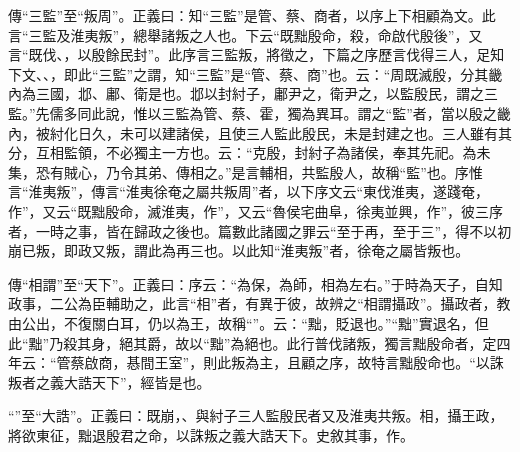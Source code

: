{\noindent\zhuan{}\fzbyks 傳“三監”至“叛周”。正義曰：知“三監”是管、蔡、商者，以序上下相顧為文。此言“三監及淮夷叛”，總舉諸叛之人也。下云“既黜殷命，殺，命啟代殷後”，又言“既伐、，以殷餘民封”。此序言三監叛，將徵之，下篇之序歷言伐得三人，足知下文、、，即此“三監”之謂，知“三監”是“管、蔡、商”也。云：“周既滅殷，分其畿內為三國，邶、鄘、衛是也。邶以封紂子，鄘尹之，衛尹之，以監殷民，謂之三監。”先儒多同此說，惟以三監為管、蔡、霍，獨為異耳。謂之“監”者，當以殷之畿內，被紂化日久，未可以建諸侯，且使三人監此殷民，未是封建之也。三人雖有其分，互相監領，不必獨主一方也。云：“克殷，封紂子為諸侯，奉其先祀。為未集，恐有賊心，乃令其弟、傳相之。”是言輔相，共監殷人，故稱“監”也。序惟言“淮夷叛”，傳言“淮夷徐奄之屬共叛周”者，以下序文云“東伐淮夷，遂踐奄，作”，又云“既黜殷命，滅淮夷，作”，又云“魯侯宅曲阜，徐夷並興，作”，彼三序者，一時之事，皆在歸政之後也。篇數此諸國之罪云“至于再，至于三”，得不以初崩已叛，即政又叛，謂此為再三也。以此知“淮夷叛”者，徐奄之屬皆叛也。 \par}

{\noindent\zhuan{}\fzbyks 傳“相謂”至“天下”。正義曰：序云：“為保，為師，相為左右。”于時為天子，自知政事，二公為臣輔助之，此言“相”者，有異于彼，故辨之“相謂攝政”。攝政者，教由公出，不復關白耳，仍以為王，故稱“”。云：“黜，貶退也。”“黜”實退名，但此“黜”乃殺其身，絕其爵，故以“黜”為絕也。此行普伐諸叛，獨言黜殷命者，定四年云：“管蔡啟商，惎間王室”，則此叛為主，且顧之序，故特言黜殷命也。“以誅叛者之義大誥天下”，經皆是也。 \par}

{\noindent\shu{}\fzkt “”至“大誥”。正義曰：既崩，、與紂子三人監殷民者又及淮夷共叛。相，攝王政，將欲東征，黜退殷君之命，以誅叛之義大誥天下。史敘其事，作。 \par}

